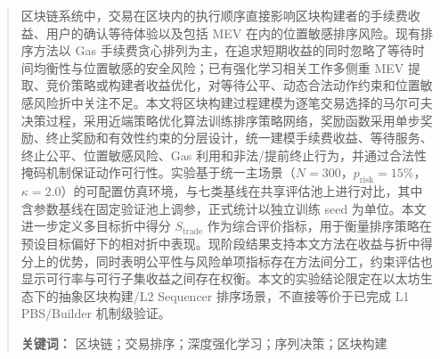
\begin{abstract}
区块链系统中，交易在区块内的执行顺序直接影响区块构建者的手续费收益、用户的确认等待体验以及包括 MEV 在内的位置敏感排序风险。现有排序方法以 Gas 手续费贪心排列为主，在追求短期收益的同时忽略了等待时间均衡性与位置敏感的安全风险；已有强化学习相关工作多侧重 MEV 提取、竞价策略或构建者收益优化，对等待公平、动态合法动作约束和位置敏感风险折中关注不足。本文将区块构建过程建模为逐笔交易选择的马尔可夫决策过程，采用近端策略优化算法训练排序策略网络，奖励函数采用单步奖励、终止奖励和有效性约束的分层设计，统一建模手续费收益、等待服务、终止公平、位置敏感风险、Gas 利用和非法/提前终止行为，并通过合法性掩码机制保证动作可行性。实验基于统一主场景（$N{=}300$，$p_{\text{risk}}{=}15\%$，$\kappa{=}2.0$）的可配置仿真环境，与七类基线在共享评估池上进行对比，其中含参数基线在固定验证池上调参，正式统计以独立训练 seed 为单位。本文进一步定义多目标折中得分 $S_{\text{trade}}$ 作为综合评价指标，用于衡量排序策略在预设目标偏好下的相对折中表现。现阶段结果支持本文方法在收益与折中得分上的优势，同时表明公平性与风险单项指标存在方法间分工，约束评估也显示可行率与可行子集收益之间存在权衡。本文的实验结论限定在以太坊生态下的抽象区块构建/L2 Sequencer 排序场景，不直接等价于已完成 L1 PBS/Builder 机制级验证。

\noindent\textbf{关键词：} 区块链；交易排序；深度强化学习；序列决策；区块构建
\end{abstract}
